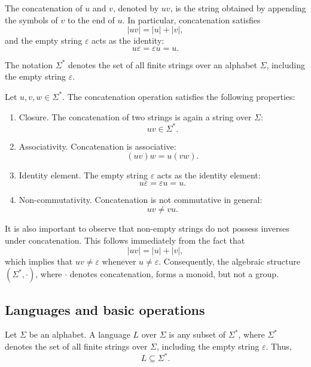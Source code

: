 \documentclass[10pt,a4paper]{article}
\begin{document}
\begin{definition}[Concatenation]
 The \textsf{concatenation} of $u$ and $v$, denoted by $uv$, is the string obtained by appending the symbols of $v$ to the end of $u$. In particular, concatenation satisfies
\[
    |uv|=|u|+|v|,
\]
and the empty string $\varepsilon$ acts as the identity:
\[
    u\varepsilon=\varepsilon u=u.
\]
\end{definition}
The notation $\Sigma^*$ denotes the set of all finite strings over an alphabet $\Sigma$, including the empty string $\varepsilon$.

Let $u,v,w\in\Sigma^*$. The concatenation operation satisfies the following properties:
\begin{enumerate}
    \item \textcolor{violet!70!black}{\textsf{Closure.}} The concatenation of two strings is again a string over $\Sigma$:
    \[
        uv\in\Sigma^*.
    \]

    \item \textcolor{violet!70!black}{\textsf{Associativity.}} Concatenation is associative:
    \[
        (uv)w=u(vw).
    \]

    \item \textcolor{violet!70!black}{\textsf{Identity element.}} The empty string $\varepsilon$ acts as the identity element:
    \[
        u\varepsilon=\varepsilon u=u.
    \]

    \item \textcolor{violet!70!black}{\textsf{Non-commutativity.}} Concatenation is not commutative in general:
    \[
        uv\neq vu.
    \]
\end{enumerate}

It is also important to observe that non-empty strings do not possess inverses under concatenation. This follows immediately from the fact that
\[
    |uv|=|u|+|v|,
\]
which implies that $uv\neq\varepsilon$ whenever $u\neq\varepsilon$. Consequently, the algebraic structure $(\Sigma^*,\cdot)$, where $\cdot$ denotes concatenation, forms a \textsf{monoid}, but not a group.

\subsection{Languages and basic operations}
\begin{definition}
Let $\Sigma$ be an alphabet. A \textsf{language} $L$ over $\Sigma$ is any subset of $\Sigma^*$, where $\Sigma^*$ denotes the set of all finite strings over $\Sigma$, including the empty string $\varepsilon$. Thus,
\[
    L\subseteq\Sigma^*.
\]
\end{definition}
\end{document}
